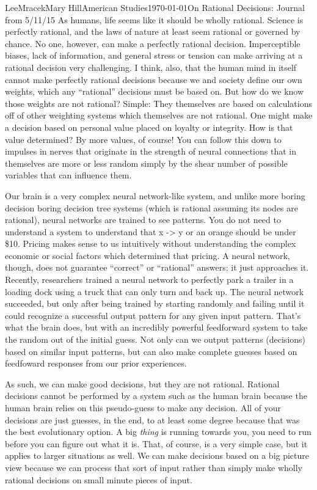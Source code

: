 \documentclass[letterpaper,11pt]{article}
\begin{document}
\begin{mla}{Lee}{Mracek}{Mary Hill}{American Studies}{\today}{On Rational Decisions: Journal from 5/11/15}
As humans, life seems like it should be wholly rational. Science is perfectly rational, and the laws of nature at least seem rational or governed by chance. No one, however, can make a perfectly rational decision. Imperceptible biases, lack of information, and general stress or tension can make arriving at a rational decision very challenging. I think, also, that the human mind in itself cannot make perfectly rational decisions because we and society define our own weights, which any ``rational'' decisions must be based on. But how do we know those weights are not rational? Simple: They themselves are based on calculations off of other weighting systems which themselves are not rational. One might make a decision based on personal value placed on loyalty or integrity. How is that value determined? By more values, of course! You can follow this down to impulses in nerves that originate in the strength of neural connections that in themselves are more or less random simply by the shear number of possible variables that can influence them.

Our brain is a very complex neural network-like system, and unlike more boring decision boring decision tree systems (which is rational assuming its nodes are rational), neural networks are trained to see patterns. You do not need to understand a system to understand that x -> y or an orange should be under \$10. Pricing makes sense to us intuitively without understanding the complex economic or social factors which determined that pricing. A neural network, though, does not guarantee ``correct'' or ``rational'' answers; it just approaches it. Recently, researchers trained a neural network to perfectly park a trailer in a loading dock using a truck that can only turn and back up. The neural network succeeded, but only after being trained by starting randomly and failing until it could recognize a successful output pattern for any given input pattern. That's what the brain does, but with an incredibly powerful feedforward system to take the random out of the initial guess. Not only can we output patterns (decisions) based on similar input patterns, but can also make complete guesses based on feedfoward responses from our prior experiences.

As such, we can make good decisions, but they are not rational. Rational decisions cannot be performed by a system such as the human brain because the human brain relies on this pseudo-guess to make any decision. All of your decisions are just guesses, in the end, to at least some degree because that was the best evolutionary option. A big \textit{thing} is running towards you, you need to run before you can figure out what it is. That, of course, is a very simple case, but it applies to larger situations as well. We can make decisions based on a big picture view because we can process that sort of input rather than simply make wholly rational decisions on small minute pieces of input.


\end{mla}
\end{document}
